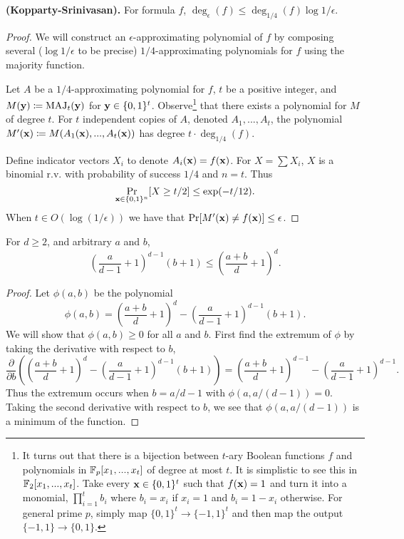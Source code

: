 \documentclass[11pt]{article}
\begin{document}
	\begin{lemma}
		\label{lem:B-EpsilonApproxDegree}
		\textbf{(Kopparty-Srinivasan).} For formula $f$, $\deg_{\epsilon}(f) \leq \deg_{1/4}(f)\log 1/\epsilon$.
	\end{lemma}
	\begin{proof}
		We will construct an $\epsilon$-approximating polynomial of $f$ by composing several ($\log 1/\epsilon$ to be precise) $1/4$-approximating polynomials for $f$ using the majority function.
		
		Let $A$ be a $1/4$-approximating polynomial for $f$, $t$ be a positive integer, and $M(\mathbf{y}) \coloneqq \mathrm{MAJ}_t(\mathbf{y})$ for $\mathbf{y} \in \{0,1\}^t$. Observe\footnote{It turns out that there is a bijection between $t$-ary Boolean functions $f$ and polynomials in $\mathbb{F}_p[x_1, ..., x_t]$ of degree at most $t$. It is simplistic to see this in $\mathbb{F}_2[x_1, ..., x_t]$. Take every $\mathbf{x} \in \{0,1\}^t$ such that $f(\mathbf{x}) = 1$ and turn it into a monomial, $\prod_{i = 1}^{t} b_i$ where $b_i = x_i$ if $x_i = 1$ and $b_i = 1 - x_i$ otherwise. For general prime $p$, simply map $\{0,1\}^t \rightarrow \{-1,1\}^t$ and then map the output $\{-1,1\}\rightarrow \{0,1\}$.} that there exists a polynomial for $M$ of degree $t$. For $t$ independent copies of $A$, denoted $A_1, ..., A_t$, the polynomial $M'(\mathbf{x}) \coloneqq M(A_1(\mathbf{x}), ..., A_{t}(\mathbf{x}))$ has degree $t \cdot \deg_{1/4}(f)$. 
		
		Define indicator vectors $X_i$ to denote $A_i(\mathbf{x}) = f(\mathbf{x})$. For $X = \sum X_i$, $X$ is a binomial r.v. with probability of success $1/4$ and $n = t$. Thus 
		\[\Pr_{\mathbf{x} \in \{0,1\}^n} [X \geq t/2] \leq \exp(-t/12).\] 
		When $t \in O(\log (1/\epsilon))$ we have that $\Pr[M'(\mathbf{x}) \neq f(\mathbf{x})] \leq \epsilon$. 
	\end{proof}

	\begin{claim}
		\label{claim:INEQ-ApproxDegAc0pFormula2Helper}
		For $d \geq 2$, and arbitrary $a$ and $b$,
		\[\left(\frac{a}{d-1} + 1\right)^{d-1}(b+1) \leq \left(\frac{a+b}{d} + 1\right)^{d}.\]
	\end{claim}
	\begin{proof}
		Let $\phi(a,b)$ be the polynomial
		\[\phi(a, b) = \left(\frac{a+b}{d} + 1\right)^{d} -  \left(\frac{a}{d-1} + 1\right)^{d-1}(b+1).\]
		We will show that $\phi(a,b) \geq 0$ for all $a$ and $b$. First find the extremum of $\phi$ by taking the derivative with respect to $b$,
		\[\frac{\partial}{\partial b} \left(\left(\frac{a+b}{d} + 1\right)^{d} -  \left(\frac{a}{d-1} + 1\right)^{d-1}(b+1)\right) = \left(\frac{a+b}{d} + 1\right)^{d-1} - \left(\frac{a}{d-1} + 1\right)^{d-1}.\]
		Thus the extremum occurs when $b = a/d-1$ with $\phi(a, a/(d-1)) = 0$. Taking the second derivative with respect to $b$, we see that $\phi(a, a/(d-1))$ is a minimum of the function. 
	\end{proof}
\end{document}
